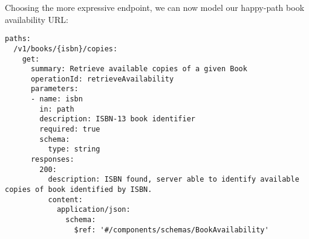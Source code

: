 \begin{minipage}{\linewidth}
Choosing the more expressive endpoint, we can now model our happy-path book availability URL:

\begin{code}
\begin{lstlisting}[belowskip=-\baselineskip]
paths:
  /v1/books/{isbn}/copies:
    get:
      summary: Retrieve available copies of a given Book
      operationId: retrieveAvailability
      parameters:
      - name: isbn
        in: path
        description: ISBN-13 book identifier
        required: true
        schema:
          type: string
      responses:
        200:
          description: ISBN found, server able to identify available copies of book identified by ISBN.
          content:
            application/json:
              schema:
                $ref: '#/components/schemas/BookAvailability'
\end{lstlisting}
\end{code}
\end{minipage}
